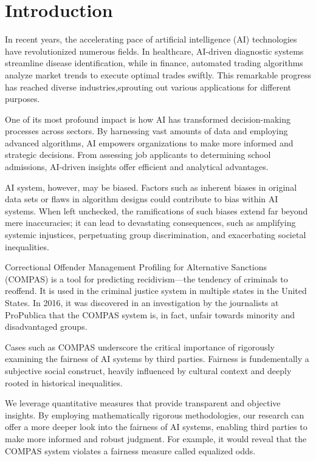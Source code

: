 \documentclass[conference]{IEEEtran}
\begin{document}
\section{Introduction}
In recent years, the accelerating pace of artificial intelligence (AI) technologies have revolutionized numerous fields. In healthcare, AI-driven diagnostic systems streamline disease identification, while in finance, automated trading algorithms analyze market trends to execute optimal trades swiftly. This remarkable progress has reached diverse industries,sprouting out various applications for different purposes.

One of its most profound impact is how AI has transformed decision-making processes across sectors. By harnessing vast amounts of data and employing advanced algorithms, AI empowers organizations to make more informed and strategic decisions. From assessing job applicants to determining school admissions, AI-driven insights offer efficient and analytical advantages.

AI system, however, may be biased. Factors such as inherent biases in original data sets or flaws in algorithm designs could contribute to bias within AI systems. When left unchecked, the ramifications of such biases extend far beyond mere inaccuracies; it can lead to devastating consequences, such as amplifying systemic injustices, perpetuating group discrimination, and exacerbating societal inequalities.

Correctional Offender Management Profiling for Alternative Sanctions (COMPAS) is a tool for predicting recidivism---the tendency of criminals to reoffend. It is used in the criminal justice system in multiple states in the United States. In 2016, it was discovered in an investigation by the journalists at ProPublica that the COMPAS system is, in fact, unfair towards minority and disadvantaged groups.

Cases such as COMPAS underscore the critical importance of rigorously examining the fairness of AI systems by third parties. Fairness is fundementally a subjective social construct, heavily influenced by cultural context and deeply rooted in historical inequalities.

We leverage quantitative measures that provide transparent and objective insights. By employing mathematically rigorous methodologies, our research can offer a more deeper look into the fairness of AI systems, enabling third parties to make more informed and robust judgment. For example, it would reveal that the COMPAS system violates a fairness measure called equalized odds.
\end{document}
